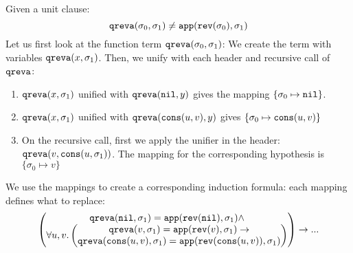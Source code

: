 \begin{example}\label{ex:3}
	Given a unit clause:
	$$\mathtt{qreva}(\sigma_0,\sigma_1)\neq\mathtt{app}(\mathtt{rev}(\sigma_0),\sigma_1)$$
	Let us first look at the function term $\mathtt{qreva}(\sigma_0,\sigma_1)$:
	We create the term with variables $\mathtt{qreva}(x,\sigma_1)$. Then, we unify with each
	header and recursive call of $\mathtt{qreva}$:
	\begin{enumerate}
		\item $\mathtt{qreva}(x,\sigma_1)$ unified with $\mathtt{qreva}(\mathtt{nil},y)$ gives the mapping $\{\sigma_0\mapsto\mathtt{nil}\}$.
		\item $\mathtt{qreva}(x,\sigma_1)$ unified with $\mathtt{qreva}(\mathtt{cons}(u,v),y)$ gives $\{\sigma_0\mapsto\mathtt{cons}(u,v)\}$
		\item On the recursive call, first we apply the unifier in the header: $\mathtt{qreva}(v, \mathtt{cons}(u,\sigma_1))$. The mapping for the corresponding hypothesis is $\{\sigma_0\mapsto v\}$
	\end{enumerate}
	We use the mappings to create a corresponding induction formula: each mapping defines what to replace:
	$$\begin{pmatrix}
	\mathtt{qreva}(\mathtt{nil},\sigma_1)=\mathtt{app}(\mathtt{rev}(\mathtt{nil}),\sigma_1)\land\\
	\forall u,v.\begin{pmatrix}\mathtt{qreva}(v,\sigma_1)=\mathtt{app}(\mathtt{rev}(v),\sigma_1)\rightarrow\\
	\mathtt{qreva}(\mathtt{cons}(u,v),\sigma_1)=\mathtt{app}(\mathtt{rev}(\mathtt{cons}(u,v)),\sigma_1)\end{pmatrix}
	\end{pmatrix}\rightarrow...$$
\end{example}

